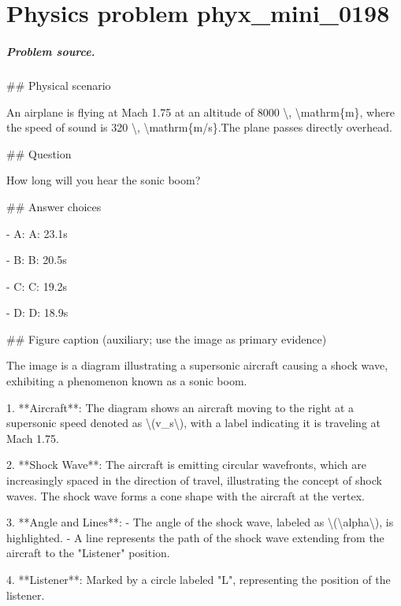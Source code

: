 
\chapter{Physics problem phyx\_mini\_0198}
\label{ch:PhyXMiniProblems_problem_phyx_mini_0198}

\paragraph{Problem source.}
\#\# Physical scenario

An airplane is flying at Mach 1.75 at an altitude of 8000 \textbackslash{}, \textbackslash{}mathrm\{m\}, where the speed of sound is 320 \textbackslash{}, \textbackslash{}mathrm\{m/s\}.The plane passes directly overhead.

\#\# Question

How long will you hear the sonic boom?

\#\# Answer choices

- A: A: 23.1s

- B: B: 20.5s

- C: C: 19.2s

- D: D: 18.9s

\#\# Figure caption (auxiliary; use the image as primary evidence)

The image is a diagram illustrating a supersonic aircraft causing a shock wave, exhibiting a phenomenon known as a sonic boom.

1. **Aircraft**: The diagram shows an aircraft moving to the right at a supersonic speed denoted as \textbackslash{}(v\_s\textbackslash{}), with a label indicating it is traveling at Mach 1.75.

2. **Shock Wave**: The aircraft is emitting circular wavefronts, which are increasingly spaced in the direction of travel, illustrating the concept of shock waves. The shock wave forms a cone shape with the aircraft at the vertex.

3. **Angle and Lines**:
   - The angle of the shock wave, labeled as \textbackslash{}(\textbackslash{}alpha\textbackslash{}), is highlighted.
   - A line represents the path of the shock wave extending from the aircraft to the "Listener" position.

4. **Listener**: Marked by a circle labeled "L", representing the position of the listener.

